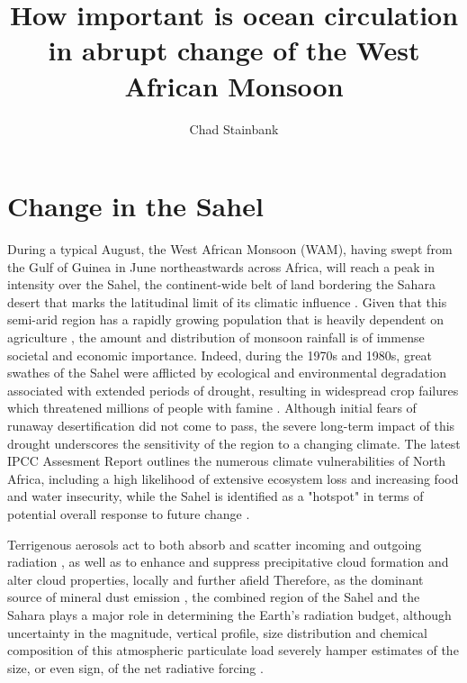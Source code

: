 \documentclass[a4paper]{article}
\begin{document}
\title{How important is ocean circulation in abrupt change of the West African Monsoon}
\author{Chad Stainbank}
\maketitle

\section{Change in the Sahel}
\label{sec:sahelwam}
During a typical August, the West African Monsoon (WAM), having swept from the Gulf of Guinea in June northeastwards across Africa, will reach a peak in intensity over the Sahel, the continent-wide belt of land bordering the Sahara desert that marks the latitudinal limit of its climatic influence \parencite{sultan2003west}.
Given that this semi-arid region has a rapidly growing population that is heavily dependent on agriculture \parencite{sissoko2011agriculture}, the amount and distribution of monsoon rainfall is of immense societal and economic importance.
Indeed, during the 1970s and 1980s, great swathes of the Sahel were afflicted by ecological and environmental degradation associated with extended periods of drought, resulting in widespread crop failures which threatened millions of people with famine \parencite{benson1998impact, olsson1993causes, walther2016review}.
Although initial fears of runaway desertification \parencite{charney1975dynamics, charney1975drought} did not come to pass, the severe long-term impact of this drought underscores the sensitivity of the region to a changing climate.
The latest IPCC Assesment Report \parencite{ipcc2014impacts} outlines the numerous climate vulnerabilities of North Africa, including a high likelihood of extensive ecosystem loss and increasing food and water insecurity, while the Sahel is identified as a "hotspot" in terms of potential overall response to future change \parencite{diffenbaugh2012climate}.

Terrigenous aerosols act to both absorb and scatter incoming and outgoing radiation \parencite{andreae1995climatic, tegen1996influence, haywood2000estimates}, as well as to enhance and suppress precipitative cloud formation and alter cloud properties, locally and further afield \parencite{rosenfeld2001desert, demott2003african, huang2006possible, karydis2011effect}  
Therefore, as the dominant source of mineral dust emission \parencite{tanaka2006numerical}, the combined region of the Sahel and the Sahara plays a major role in determining the Earth's radiation budget, although uncertainty in the magnitude, vertical profile, size distribution and chemical composition of this atmospheric particulate load severely hamper estimates of the size, or even sign, of the net radiative forcing \parencite{claquin1998uncertainties, sokolik2001introduction, durant2009sensitivity}.
 
\end{document}
